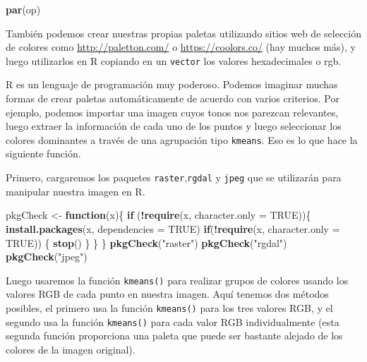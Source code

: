 \documentclass[
]{book}
\newenvironment{Shaded}{\begin{snugshade}}{\end{snugshade}}
\newcommand{\ControlFlowTok}[1]{\textcolor[rgb]{0.13,0.29,0.53}{\textbf{#1}}}
\newcommand{\DataTypeTok}[1]{\textcolor[rgb]{0.13,0.29,0.53}{#1}}
\newcommand{\KeywordTok}[1]{\textcolor[rgb]{0.13,0.29,0.53}{\textbf{#1}}}
\newcommand{\NormalTok}[1]{#1}
\newcommand{\OperatorTok}[1]{\textcolor[rgb]{0.81,0.36,0.00}{\textbf{#1}}}
\newcommand{\OtherTok}[1]{\textcolor[rgb]{0.56,0.35,0.01}{#1}}
\newcommand{\StringTok}[1]{\textcolor[rgb]{0.31,0.60,0.02}{#1}}
\begin{document}
\begin{Shaded}
\begin{Highlighting}[]
\KeywordTok{par}\NormalTok{(op)}
\end{Highlighting}
\end{Shaded}

También podemos crear nuestras propias paletas utilizando sitios web de selección de colores como \url{http://paletton.com/} o \url{https://coolors.co/} (hay muchos más), y luego utilizarlos en R copiando en un \texttt{vector} los valores hexadecimales o rgb.

R es un lenguaje de programación muy poderoso. Podemos imaginar muchas formas de crear paletas automáticamente de acuerdo con varios criterios. Por ejemplo, podemos importar una imagen cuyos tonos nos parezcan relevantes, luego extraer la información de cada uno de los puntos y luego seleccionar los colores dominantes a través de una agrupación tipo \texttt{kmeans}. Eso es lo que hace la siguiente función.

Primero, cargaremos los paquetes \texttt{raster},\texttt{rgdal} y \texttt{jpeg} que se utilizarán para manipular nuestra imagen en R.

\begin{Shaded}
\begin{Highlighting}[]
\NormalTok{pkgCheck <-}\StringTok{ }\ControlFlowTok{function}\NormalTok{(x)\{ }
  \ControlFlowTok{if}\NormalTok{ (}\OperatorTok{!}\KeywordTok{require}\NormalTok{(x, }\DataTypeTok{character.only =} \OtherTok{TRUE}\NormalTok{))\{}
    \KeywordTok{install.packages}\NormalTok{(x, }\DataTypeTok{dependencies =} \OtherTok{TRUE}\NormalTok{)}
      \ControlFlowTok{if}\NormalTok{(}\OperatorTok{!}\KeywordTok{require}\NormalTok{(x, }\DataTypeTok{character.only =} \OtherTok{TRUE}\NormalTok{)) \{}
        \KeywordTok{stop}\NormalTok{()}
\NormalTok{    \}}
\NormalTok{  \}}
\NormalTok{\}}
\KeywordTok{pkgCheck}\NormalTok{(}\StringTok{"raster"}\NormalTok{)}
\KeywordTok{pkgCheck}\NormalTok{(}\StringTok{"rgdal"}\NormalTok{)}
\KeywordTok{pkgCheck}\NormalTok{(}\StringTok{"jpeg"}\NormalTok{)}
\end{Highlighting}
\end{Shaded}

Luego usaremos la función \texttt{kmeans()} para realizar grupos de colores usando los valores RGB de cada punto en nuestra imagen. Aquí tenemos dos métodos posibles, el primero usa la función \texttt{kmeans()} para los tres valores RGB, y el segundo usa la función \texttt{kmeans()} para cada valor RGB individualmente (esta segunda función proporciona una paleta que puede ser bastante alejado de los colores de la imagen original).
\end{document}
